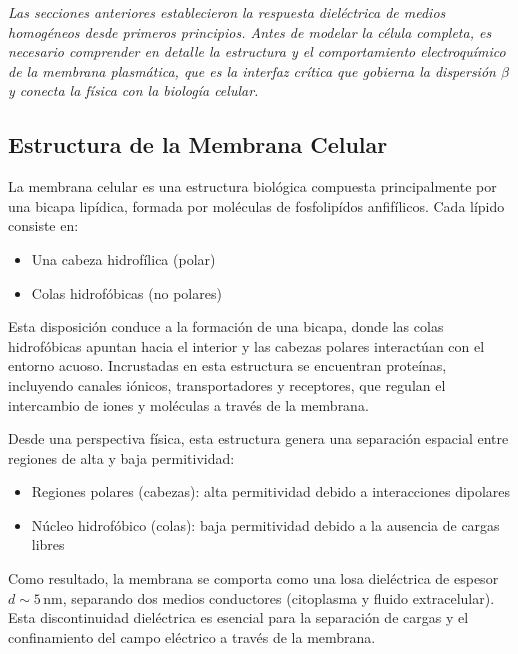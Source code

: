 \documentclass[12pt]{article}
\begin{document}
\noindent\textit{Las secciones anteriores establecieron la respuesta diel\'ectrica de medios
homog\'eneos desde primeros principios. Antes de modelar la c\'elula completa, es necesario
comprender en detalle la estructura y el comportamiento electroqu\'imico de la membrana
plasm\'atica, que es la interfaz cr\'itica que gobierna la dispersi\'on $\beta$ y conecta la f\'isica
con la biolog\'ia celular.}

\subsection{Estructura de la Membrana Celular}

La membrana celular es una estructura biol\'ogica compuesta principalmente por una bicapa
lip\'idica, formada por mol\'eculas de fosfolip\'idos anfif\'ilicos. Cada l\'ipido consiste en:

\begin{itemize}
\item Una cabeza hidrof\'ilica (polar)
\item Colas hidrof\'obicas (no polares)
\end{itemize}

Esta disposici\'on conduce a la formaci\'on de una bicapa, donde las colas hidrof\'obicas apuntan
hacia el interior y las cabezas polares interact\'uan con el entorno acuoso. Incrustadas en esta
estructura se encuentran prote\'inas, incluyendo canales i\'onicos, transportadores y receptores,
que regulan el intercambio de iones y mol\'eculas a trav\'es de la membrana.

Desde una perspectiva f\'isica, esta estructura genera una separaci\'on espacial entre regiones
de alta y baja permitividad:

\begin{itemize}
\item Regiones polares (cabezas): alta permitividad debido a interacciones dipolares
\item N\'ucleo hidrof\'obico (colas): baja permitividad debido a la ausencia de cargas libres

\end{itemize}

Como resultado, la membrana se comporta como una losa diel\'ectrica de espesor $d \sim
5\,\text{nm}$, separando dos medios conductores (citoplasma y fluido extracelular). Esta
discontinuidad diel\'ectrica es esencial para la separaci\'on de cargas y el confinamiento del
campo el\'ectrico a trav\'es de la membrana.
\end{document}
